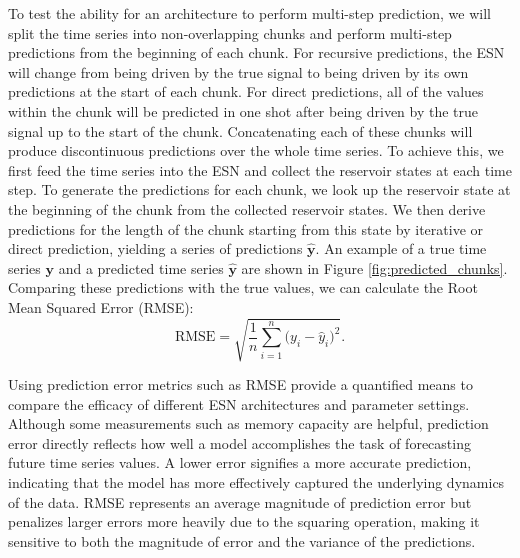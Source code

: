 To test the ability for an architecture to perform multi-step prediction, we will split the time series into non-overlapping chunks and perform multi-step predictions from the beginning of each chunk. For recursive predictions, the ESN will change from being driven by the true signal to being driven by its own predictions at the start of each chunk. For direct predictions, all of the values within the chunk will be predicted in one shot after being driven by the true signal up to the start of the chunk. Concatenating each of these chunks will produce discontinuous predictions over the whole time series. To achieve this, we first feed the time series into the ESN and collect the reservoir states at each time step. To generate the predictions for each chunk, we look up the reservoir state at the beginning of the chunk from the collected reservoir states. We then derive predictions for the length of the chunk starting from this state by iterative or direct prediction, yielding a series of predictions $\mathbf{\hat y}$. An example of a true time series $\mathbf{y}$ and a predicted time series $\mathbf{\hat y}$ are shown in Figure \ref{fig:predicted_chunks}. Comparing these predictions with the true values, we can calculate the Root Mean Squared Error (RMSE):
\[
  \mathrm{RMSE}
  = \sqrt{\frac{1}{n}\sum_{i=1}^n \bigl(y_i - \hat y_i\bigr)^2}.
\]


Using prediction error metrics such as RMSE provide a quantified means to compare the efficacy of different ESN architectures and parameter settings. Although some measurements such as memory capacity are helpful, prediction error directly reflects how well a model accomplishes the task of forecasting future time series values. A lower error signifies a more accurate prediction, indicating that the model has more effectively captured the underlying dynamics of the data. RMSE represents an average magnitude of prediction error but penalizes larger errors more heavily due to the squaring operation, making it sensitive to both the magnitude of error and the variance of the predictions.

